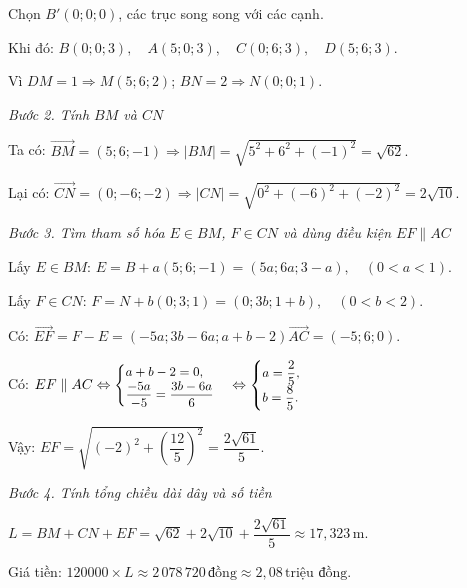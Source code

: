 \documentclass[12pt,a4paper,oneside]{book}
\theoremstyle{theorem}
\theoremstyle{definition}
\begin{document}
        Chọn $B'(0;0;0)$, các trục song song với các cạnh. 
        
        Khi đó:
            $B(0;0;3),\quad A(5;0;3),\quad C(0;6;3),\quad D(5;6;3).$
       
        Vì $DM=1\Rightarrow M(5;6;2)$; $BN=2\Rightarrow N(0;0;1)$.
        
    \noindent \textit{Bước 2. Tính $BM$ và $CN$}
    
        Ta có: $\overrightarrow{BM}=(5;6;-1) \Rightarrow |BM|=\sqrt{5^2+6^2+(-1)^2}=\sqrt{62}.$
        
        Lại có:
        $\overrightarrow{CN}=(0;-6;-2) \Rightarrow |CN|=\sqrt{0^2+(-6)^2+(-2)^2}=2\sqrt{10}.$
        
    \noindent \textit{Bước 3. Tìm tham số hóa $E\in BM$, $F\in CN$ và dùng điều kiện $EF\parallel AC$}
        
        Lấy $E\in BM$: $E=B+a(5;6;-1)=(5a;6a;3-a),\quad (0<a<1).$
        
        Lấy $F\in CN$:
        $F=N+b(0;3;1)=(0;3b;1+b),\quad (0<b<2).$
        
        Có:
        $\overrightarrow{EF}=F-E=(-5a;3b-6a;a+b-2) \overrightarrow{AC}=(-5;6;0).$
        
        Có:
        $EF\parallel AC
        \Leftrightarrow
        \small \begin{cases}
        a+b-2=0,\\
        \dfrac{-5a}{-5}=\dfrac{3b-6a}{6}
        \end{cases}
        \Leftrightarrow
        \small \begin{cases}
        a=\dfrac{2}{5},\\
        b=\dfrac{8}{5}.
        \end{cases}$
        
        Vậy:
        $EF=\sqrt{(-2)^2+\left(\dfrac{12}{5}\right)^2}
        =\dfrac{2\sqrt{61}}{5}.$
        
        \noindent \textit{Bước 4. Tính tổng chiều dài dây và số tiền}
        
        $L=BM+CN+EF
        =\sqrt{62}+2\sqrt{10}+\dfrac{2\sqrt{61}}{5}
        \approx17,323\,\mathrm{m}.$
        
        Giá tiền:
        $120000\times L\approx2\,078\,720\,\text{đồng}
        \approx2,08\,\text{triệu đồng}.$
\end{document}
